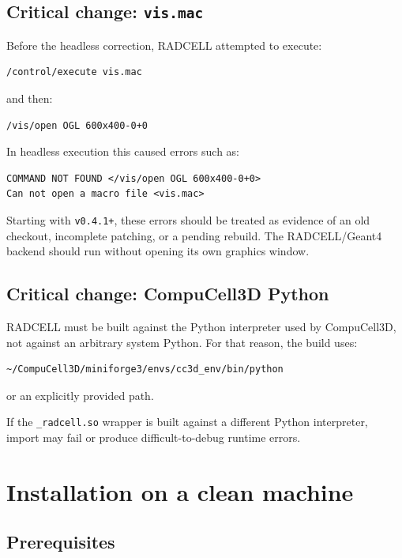 \documentclass[11pt,a4paper,twoside,pdftex]{refrep}
\begin{document}
\section{Critical change: \texttt{vis.mac}}

Before the headless correction, RADCELL attempted to execute:

\begin{lstlisting}
/control/execute vis.mac
\end{lstlisting}

and then:

\begin{lstlisting}
/vis/open OGL 600x400-0+0
\end{lstlisting}

In headless execution this caused errors such as:

\begin{lstlisting}
COMMAND NOT FOUND </vis/open OGL 600x400-0+0>
Can not open a macro file <vis.mac>
\end{lstlisting}

Starting with \texttt{v0.4.1+}, these errors should be treated as evidence of an old checkout, incomplete patching, or a pending rebuild. The RADCELL/Geant4 backend should run without opening its own graphics window.

\section{Critical change: CompuCell3D Python}

RADCELL must be built against the Python interpreter used by CompuCell3D, not against an arbitrary system Python. For that reason, the build uses:

\begin{lstlisting}
~/CompuCell3D/miniforge3/envs/cc3d_env/bin/python
\end{lstlisting}

or an explicitly provided path.

If the \texttt{\_radcell.so} wrapper is built against a different Python interpreter, import may fail or produce difficult-to-debug runtime errors.

\chapter{Installation on a clean machine}

\section{Prerequisites}
\end{document}
